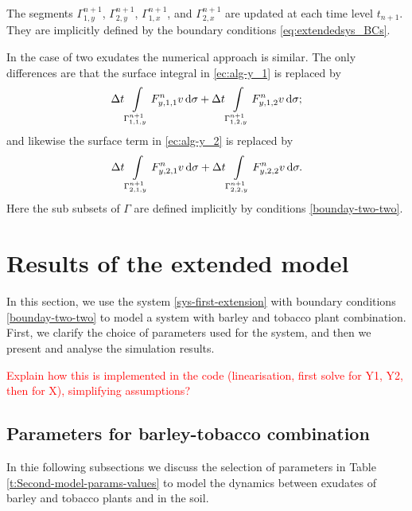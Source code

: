 \documentclass[11pt]{article}
\numberwithin{equation}{section}
\begin{document}
The segments \( \Gamma_{1,y}^{n+1}\), \(\Gamma_{2,y}^{n+1}\), \( \Gamma_{1,x}^{n+1}\), and \(\Gamma_{2,x}^{n+1}\) are updated at each time level \(t_{n+1}\). They are implicitly defined by the boundary conditions \eqref{eq:extendedsys_BCs}.


\vspace{1\baselineskip}
In the case of two exudates the numerical approach is similar. The only differences are that the surface integral in \eqref{ec:alg-y_1} is replaced by
\[
    \Delta t \int\limits_{\Gamma_{1,1,y}^{n+1}} F_{y,1,1}^n v \dif\sigma
    + \Delta t \int\limits_{\Gamma_{1,2,y}^{n+1}} F_{y,1,2}^n v \dif\sigma;
\]
and likewise the surface term in \eqref{ec:alg-y_2} is replaced by
\[
    \Delta t \int\limits_{\Gamma_{2,1,y}^{n+1}} F_{y,2,1}^n v \dif\sigma
    +\Delta t \int\limits_{\Gamma_{2,2,y}^{n+1}} F_{y,2,2}^n v \dif\sigma.
\]
Here the sub subsets of \(\Gamma\) are defined implicitly by conditions \eqref{bounday-two-two}.











\section{Results of the extended model}
\label{sec:Results_Extension}
In this section, we use the system \eqref{sys-first-extension} with boundary conditions \eqref{bounday-two-two} to model a system with barley and tobacco plant combination. First, we clarify the choice of parameters used for the system, and then we present and analyse the simulation results. 

\textcolor{red}{Explain how this is implemented in the code (linearisation, first solve for Y1, Y2, then for X), simplifying assumptions?}


\subsection{Parameters for barley-tobacco combination}
In thie following subsections we discuss the selection of parameters in Table \ref{t:Second-model-params-values} to model the dynamics between exudates of barley and tobacco plants and  in the soil.
\end{document}
